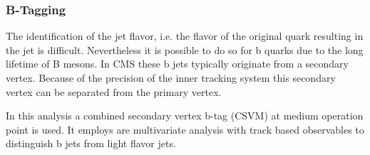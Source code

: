 \subsubsection{B-Tagging}

The identification of the jet flavor, i.e. the flavor of the original quark resulting in the jet is difficult. Nevertheless it is possible to do so for b quarks due to the long lifetime of B mesons. In CMS these b jets typically originate from a secondary vertex. Because of the precision of the inner tracking system this secondary vertex can be separated from the primary vertex. \\

In this analysis a combined secondary vertex b-tag (CSVM) \cite{Chatrchyan:2012jua} at medium operation point is used. It employs are multivariate analysis with track based observables to distinguish b jets from light flavor jets.